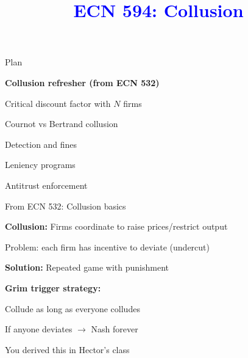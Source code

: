 \documentclass[notes,11pt, aspectratio=169]{beamer}
\title[]{\textcolor{blue}{ECN 594: Collusion}}
\author[PGP]{}
\institute[FRBNY]{\small{\begin{tabular}{c c c}
Nicholas Vreugdenhil \\
\end{tabular}}}
\date{}
\newenvironment{wideitemize}{\itemize\addtolength{\itemsep}{10pt}}{\enditemize}
\newenvironment{wideenumerate}{\enumerate\addtolength{\itemsep}{10pt}}{\endenumerate}
\begin{document}
\begin{frame}
\maketitle
  \centering
\end{frame}

\begin{frame}{Plan}
  \begin{wideenumerate}
    \item \textbf{Collusion refresher (from ECN 532)}
    \item Critical discount factor with $N$ firms
    \item Cournot vs Bertrand collusion
    \item Detection and fines
    \item Leniency programs
    \item Antitrust enforcement
  \end{wideenumerate}
\end{frame}


\begin{frame}{From ECN 532: Collusion basics}
	\begin{wideitemize}
		\item \textbf{Collusion:} Firms coordinate to raise prices/restrict output
		\item Problem: each firm has incentive to deviate (undercut)
		\item \textbf{Solution:} Repeated game with punishment
		\item \textbf{Grim trigger strategy:}
		\begin{wideitemize}
			\vspace{5pt}
			\item Collude as long as everyone colludes
			\item If anyone deviates $\rightarrow$ Nash forever
		\end{wideitemize}
		\item You derived this in Hector's class
	\end{wideitemize}
\end{frame}
\end{document}
